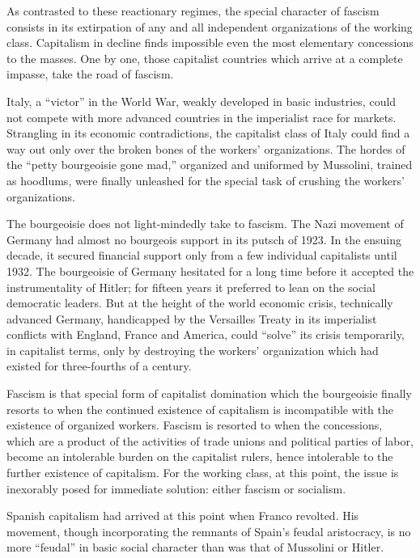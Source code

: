 As contrasted to these reactionary regimes, the special character of fascism consists in its extirpation of any and all independent organizations of the working class. Capitalism in decline finds impossible even the most elementary concessions to the masses. One by one, those capitalist countries which arrive at a complete impasse, take the road of fascism.

Italy, a ``victor'' in the World War, weakly developed in basic industries, could not compete with more advanced countries in the imperialist race for markets. Strangling in its economic contradictions, the capitalist class of Italy could find a way out only over the broken bones of the workers’ organizations. The hordes of the ``petty bourgeoisie gone mad,'' organized and uniformed by Mussolini,{\indexBMussolini} trained as hoodlums, were finally unleashed for the special task of crushing the workers’ organizations.

The bourgeoisie does not light-mindedly take to fascism. The Nazi movement of Germany had almost no bourgeois support in its putsch of 1923. In the ensuing decade, it secured financial support only from a few individual capitalists until 1932. The bourgeoisie of Germany hesitated for a long time before it accepted the instrumentality of Hitler{\indexAHitler}; for fifteen years it preferred to lean on the social democratic leaders. But at the height of the world economic crisis, technically advanced Germany, handicapped by the Versailles Treaty in its imperialist conflicts with England, France and America, could ``solve'' its crisis temporarily, in capitalist terms, only by destroying the workers’ organization which had existed for three-fourths of a century.

Fascism is that special form of capitalist domination which the bourgeoisie finally resorts to when the continued existence of capitalism is incompatible with the existence of organized workers. Fasc\-ism is resorted to when the concessions, which are a product of the activities of trade unions and political parties of labor, become an intolerable burden on the capitalist rulers, hence intolerable to the further existence of capitalism. For the working class, at this point, the issue is inexorably posed for immediate solution: either fascism or socialism.

Spanish capitalism had arrived at this point when Franco revolted. His movement, though incorporating the remnants of Spain’s feudal aristocracy, is no more ``feudal'' in basic social character than was that of Mussolini or Hitler.

